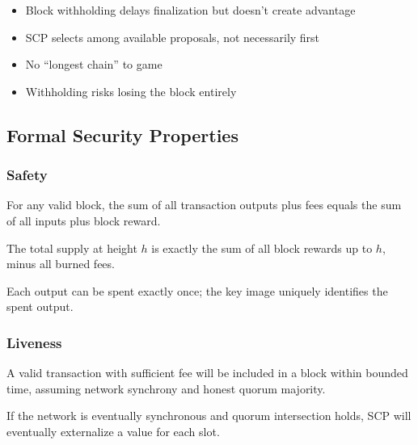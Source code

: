\begin{itemize}
  \item Block withholding delays finalization but doesn't create advantage
  \item SCP selects among available proposals, not necessarily first
  \item No ``longest chain'' to game
  \item Withholding risks losing the block entirely
\end{itemize}

\subsection{Formal Security Properties}

\subsubsection{Safety}

\begin{property}
For any valid block, the sum of all transaction outputs plus fees equals
the sum of all inputs plus block reward.
\end{property}

\begin{property}[No Inflation]
The total supply at height $h$ is exactly the sum of all block rewards
up to $h$, minus all burned fees.
\end{property}

\begin{property}
Each output can be spent exactly once; the key image uniquely identifies
the spent output.
\end{property}

\subsubsection{Liveness}

\begin{property}
A valid transaction with sufficient fee will be included in a block within
bounded time, assuming network synchrony and honest quorum majority.
\end{property}

\begin{property}
If the network is eventually synchronous and quorum intersection holds,
SCP will eventually externalize a value for each slot.
\end{property}

